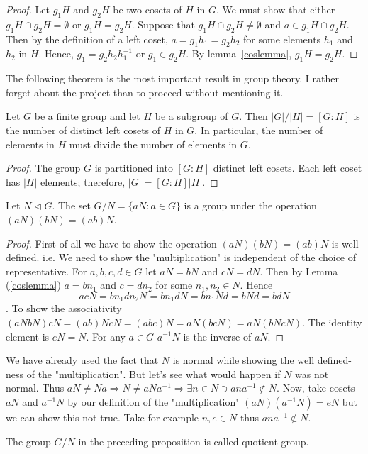 \begin{proof}
Let $g_1 H$ and $g_2 H$ be two cosets of $H$ in $G$.  We must show that either $g_1 H \cap g_2 H = \emptyset$ or $g_1 H = g_2 H$.  Suppose that $g_1 H \cap g_2 H \neq \emptyset$ and $a \in g_1 H \cap g_2 H$.  Then by the definition of a left coset, $a = g_1 h_1 = g_2 h_2$ for some elements $h_1$ and $h_2$ in $H$.  Hence, $g_1 = g_2 h_2 h_1^{-1}$ or $g_1 \in g_2 H$.  By lemma~\ref{coslemma}, $g_1 H = g_2 H$.
\end{proof}

The following theorem is the most important result in group theory. I rather forget about the project than to proceed without mentioning it.

\begin{theorem}[Lagrange]
Let $G$ be a finite group and let $H$ be a subgroup of $G$.  Then $|G|/|H| = [G : H]$ is the number of distinct left cosets of $H$ in $G$.  In particular, the number of elements in $H$ must divide the number of elements in $G$.
\end{theorem}

\begin{proof}
The group $G$ is partitioned into $[G : H]$ distinct left cosets.  Each left coset has $|H|$ elements; therefore, $|G| = [G : H] |H|$.
\end{proof}

\begin{proposition}
Let $N\lhd G$. The set $G/N = \{ aN:a\in G\}$ is a group under the operation $(aN)(bN)=(ab)N$.
\end{proposition}
\begin{proof}
First of all we have to show the operation $(aN)(bN)=(ab)N$ is well defined. i.e. We need to show the "multiplication" is independent of the choice of representative. For $a,b,c,d\in G$ let $aN=bN$ and $cN=dN$. Then by Lemma (\ref{coslemma}) $a=bn_1$ and $c=dn_2$ for some $n_1,n_2\in N$. Hence $$ acN=bn_1dn_2N=bn_1dN=bn_1Nd=bNd=bdN$$.
To show the associativity $(aNbN)cN=(ab)NcN=(abc)N=aN(bcN)=aN(bNcN).$ The identity element is $eN=N$. For any $a\in G$ $a^{-1}N$ is the inverse of $aN$.
\end{proof}
We have already used the fact that $N$ is normal while showing the well defined-ness of the "multiplication". But let's see what would happen if $N$ was not normal. Thus $aN\neq Na \Rightarrow N\neq aNa^{-1} \Rightarrow \exists n\in N \ni ana^{-1}\notin N $. Now, take cosets $aN$ and $a^{-1}N$ by our definition of the "multiplication" $(aN)(a^{-1}N)=eN$ but we can show this not true. Take for example $n,e\in N$ thus $ana^{-1}\notin N$.
\begin{definition}
The group $G/N$ in the preceding proposition is called quotient group.
\end{definition}

